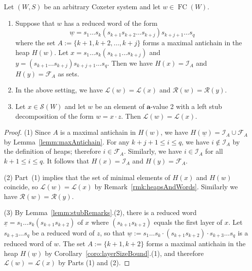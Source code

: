 \documentclass[ALCO,Unicode,published]{cedram}
\newcommand{\cali}{\mathcal{I}}
\newcommand{\calf}{\mathcal{F}}
\newcommand{\call}{\mathcal{L}}
\newcommand{\calr}{\mathcal{R}}
\newcommand{\la}{\mathbf{a}}
\newcommand{\sw}{\mathcal{S}(W)}
\newcommand{\ul}{\underline}
\DeclareMathOperator{\fc}{\mathrm{FC}}
\begin{document}
\begin{lemma}
    \label{lemm:decompAndDescent}
    Let $(W,S)$ be an arbitrary Coxeter system and let $w\in \fc(W)$.
    \begin{enumerate}
        \item Suppose that $w$ has a reduced word of the form 
            \[
                \ul w=s_1\dots s_k (s_{k+1}s_{k+2}\dots s_{k+j})s_{k+j+1}\dots s_{q}
         \]
         where the set $A:=\{k+1,k+2,\dots,k+j\}$ forms a maximal antichain in
             the heap $H(w)$. Let $x=s_1\dots s_k(s_{k+1}\dots s_{k+j})$ and $y=(s_{k+1}\dots s_{k+j})s_{k+j+1}\dots s_q$.
             Then we have $H(x)=\cali_A$ and $H(y)=\calf_A$ as sets. 
            
        \item In the above setting, we have $\call(w)=\call(x)$ and $\calr(w)=\calr(y)$.  

        \item Let $x\in \sw$ and let $w$ be an element of $\la$-value 2 with a
    left stub decomposition of the form $w=x\cdot z$. Then $\call(w)=\call(x)$.
    \end{enumerate}
\end{lemma}
\begin{proof}
    (1) Since $A$ is a maximal antichain in $H(w)$, we have $H(\ul w)=\cali_{A}\cup\calf_{A}$ by
    Lemma~\ref{lemm:maxAntichain}. For any $k+j+1\le i\le q$, we have $i\notin\cali_A$ by the definition
    of heaps; therefore $i\in \calf_A$. Similarly, we have $i\in \cali_A$ for all $k+1\le i\le q$.
    It follows that $H(x)=\cali_A$ and $H(y)=\calf_A$.

    (2) Part~(1) implies that the set of minimal elements of $H(x)$ and $H(w)$ coincide, so
    $\call(w)= \call(x)$ by Remark~\ref{rmk:heapsAndWords}. Similarly we have $\calr(w)=\calr(y)$.

    (3) By Lemma~\ref{lemm:stubRemarks}.(2), there is a reduced word $\ul x=s_1\dots
    s_{k}(s_{k+1}s_{k+2})$ of $x$ where $(s_{k+1}s_{k+2})$ equals the first layer of $x$. Let
    $s_{k+3}\dots s_{q}$ be a reduced word of $z$, so that $\ul{w}:=s_1\dots s_k\cdot
    (s_{k+1}s_{k+2})\cdot s_{k+3}\dots s_{q}$ is a reduced word of $w$.  The set $A:=\{k+1,k+2\}$
    forms a maximal antichain in the heap $H(\ul w)$ by Corollary~\ref{coro:layerSizeBound}.(1), and
    therefore $\call(w)=\call(x)$ by Parts (1) and (2).
\end{proof}
\end{document}
